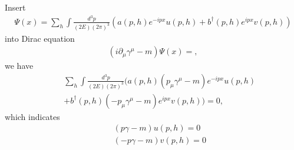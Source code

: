 \documentclass[11pt]{article}
\def\del{{\partial}}
\begin{document}
\section{ }
Insert
\begin{eqnarray}
  \Psi(x)
  = \sum_h \int \frac{d^3p}{(2E)(2\pi)^3}(a(p,h) e^{-ipx} u(p,h) + b^\dagger(p,h) e^{ipx} v(p,h)) 
\end{eqnarray}
into Dirac equation
\begin{eqnarray}
  (i\del_\mu \gamma^\mu -m) \Psi(x) =,
\end{eqnarray}
we have 
\begin{eqnarray}
  &&\sum_h \int \frac{d^3p}{(2E)(2\pi)^3}(a(p,h)(p_\mu \gamma^\mu-m)  e^{-ipx} u(p,h) \nonumber \\ &&+ b^\dagger(p,h) (-p_\mu \gamma^\mu-m)e^{ipx} v(p,h)) = 0,
\end{eqnarray}
which indicates
\begin{eqnarray}
  && (  p\gamma -m ) u(p,h) = 0  \\
  && ( -p\gamma -m)  v(p,h) = 0 
\end{eqnarray}
\end{document}
